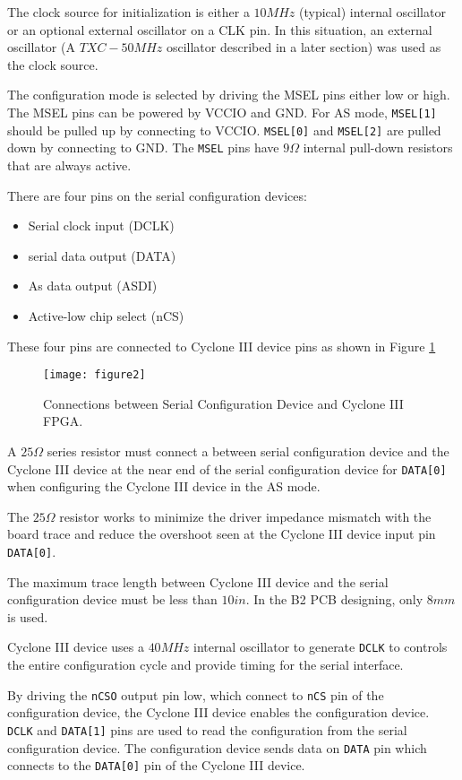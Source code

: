 The clock source for initialization is either a $10MHz$ (typical) internal oscillator or
an optional external oscillator on a CLK pin. In this situation, an external oscillator
(A $TXC-50MHz$ oscillator described in a later section) was used as the clock source.

The configuration mode is selected by driving the MSEL pins either low or high.
The MSEL pins can be powered by VCCIO and GND. For AS mode, \texttt{MSEL[1]} should be pulled up by connecting to VCCIO. \texttt{MSEL[0]} and \texttt{MSEL[2]} are pulled down by connecting to GND. The \texttt{MSEL} pins have $9\Omega$ internal pull-down resistors that are always active.



There are four pins on the serial configuration devices:
\begin{itemize}
 \item Serial clock input (DCLK)
 \item serial data output (DATA)
 \item As data output (ASDI)
 \item Active-low chip select (nCS)
\end{itemize}

These four pins are connected to Cyclone III device pins as shown in Figure \ref{fig:b2_f2}

\begin{figure}
 \centering
 \texttt{[image: figure2]}
 \caption{Connections between Serial Configuration Device and Cyclone III FPGA.}
 \label{fig:b2_f2}
\end{figure}

A $25\Omega$ series resistor must connect a between serial configuration device and
the Cyclone III device at the near end of the serial configuration device for \texttt{DATA[0]}
when configuring the Cyclone III device in the AS mode.

The $25\Omega$ resistor works to minimize the driver impedance mismatch with the board trace
and reduce the overshoot seen at the Cyclone III device input pin \texttt{DATA[0]}.

The maximum trace length between Cyclone III device and the serial configuration device must be less than $10in$. In the B2 PCB designing, only $8mm$ is used.

Cyclone III device uses a $40MHz$ internal oscillator to generate \texttt{DCLK} to controls the entire configuration cycle and provide timing for the serial interface.

By driving the \texttt{nCSO} output pin low, which connect to \texttt{nCS} pin of the configuration device,
the Cyclone III device enables the configuration device.  \texttt{DCLK} and \texttt{DATA[1]} pins are used
to read the configuration from the serial configuration device. The configuration device sends data
on \texttt{DATA} pin which connects to the \texttt{DATA[0]} pin of the Cyclone III device.

